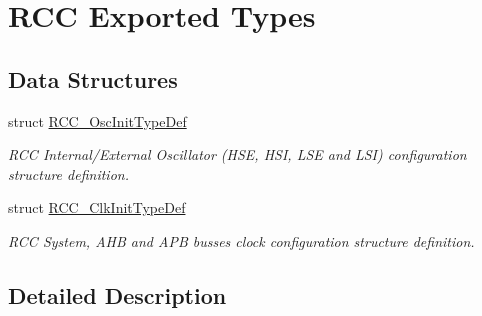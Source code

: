 \hypertarget{group___r_c_c___exported___types}{}\section{R\+CC Exported Types}
\label{group___r_c_c___exported___types}
\subsection*{Data Structures}
\begin{DoxyCompactItemize}
\item 
struct \hyperlink{struct_r_c_c___osc_init_type_def}{R\+C\+C\+\_\+\+Osc\+Init\+Type\+Def}
\begin{DoxyCompactList}\small\item\em R\+CC Internal/\+External Oscillator (H\+SE, H\+SI, L\+SE and L\+SI) configuration structure definition. \end{DoxyCompactList}\item 
struct \hyperlink{struct_r_c_c___clk_init_type_def}{R\+C\+C\+\_\+\+Clk\+Init\+Type\+Def}
\begin{DoxyCompactList}\small\item\em R\+CC System, A\+HB and A\+PB busses clock configuration structure definition. \end{DoxyCompactList}\end{DoxyCompactItemize}


\subsection{Detailed Description}
